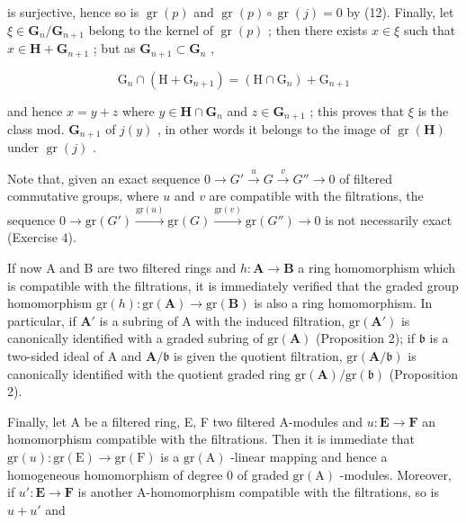 is surjective, hence so is \(\operatorname{gr}(p)\) and \(\operatorname{gr}(p) \circ \operatorname{gr}(j) = 0\) by (12). Finally, let \(\xi \in \mathbf{G}_n / \mathbf{G}_{n+1}\) belong to the kernel of \(\operatorname{gr}(p)\) ; then there exists \(x \in \xi\) such that \(x \in \mathbf{H} + \mathbf{G}_{n+1}\) ; but as \(\mathbf{G}_{n+1} \subset \mathbf{G}_n\) ,

\[
\mathrm{G} _ {n} \cap (\mathrm{H} + \mathrm{G} _ {n + 1}) = (\mathrm{H} \cap \mathrm{G} _ {n}) + \mathrm{G} _ {n + 1}
\]

and hence \(x = y + z\) where \(y \in \mathbf{H} \cap \mathbf{G}_n\) and \(z \in \mathbf{G}_{n+1}\) ; this proves that \(\xi\) is the class mod. \(\mathbf{G}_{n+1}\) of \(j(y)\) , in other words it belongs to the image of \(\operatorname{gr}(\mathbf{H})\) under \(\operatorname{gr}(j)\) .

Note that, given an exact sequence \(0 \to G' \xrightarrow{u} G \xrightarrow{v} G'' \to 0\) of filtered commutative groups, where \(u\) and \(v\) are compatible with the filtrations, the sequence \(0 \longrightarrow \text{gr}(G') \xrightarrow{\text{gr}(u)} \text{gr}(G) \xrightarrow{\text{gr}(v)} \text{gr}(G'') \longrightarrow 0\) is not necessarily exact (Exercise 4).

If now A and B are two filtered rings and \(h \colon \mathbf{A} \to \mathbf{B}\) a ring homomorphism which is compatible with the filtrations, it is immediately verified that the graded group homomorphism \(\mathrm{gr}(h) \colon \mathrm{gr}(\mathbf{A}) \to \mathrm{gr}(\mathbf{B})\) is also a ring homomorphism. In particular, if \(\mathbf{A}'\) is a subring of A with the induced filtration, \(\mathrm{gr}(\mathbf{A}')\) is canonically identified with a graded subring of \(\mathrm{gr}(\mathbf{A})\) (Proposition 2); if \(\mathfrak{b}\) is a two-sided ideal of A and \(\mathbf{A} / \mathfrak{b}\) is given the quotient filtration, \(\mathrm{gr}(\mathbf{A} / \mathfrak{b})\) is canonically identified with the quotient graded ring \(\mathrm{gr}(\mathbf{A}) / \mathrm{gr}(\mathfrak{b})\) (Proposition 2).

Finally, let A be a filtered ring, E, F two filtered A-modules and \(u: \mathbf{E} \to \mathbf{F}\) an homomorphism compatible with the filtrations. Then it is immediate that \(\mathrm{gr}(u): \mathrm{gr}(\mathrm{E}) \to \mathrm{gr}(\mathrm{F})\) is a \(\mathrm{gr}(\mathrm{A})\) -linear mapping and hence a homogeneous homomorphism of degree 0 of graded \(\mathrm{gr}(\mathrm{A})\) -modules. Moreover, if \(u': \mathbf{E} \to \mathbf{F}\) is another A-homomorphism compatible with the filtrations, so is \(u + u'\) and

